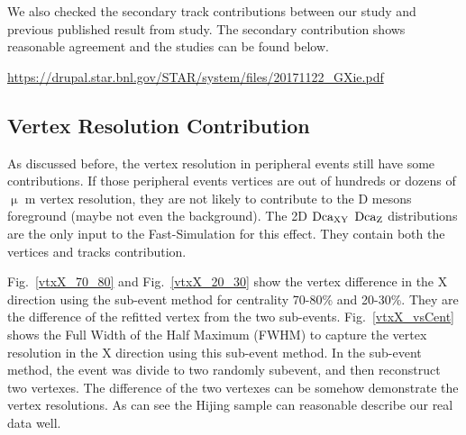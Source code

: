 We also checked the secondary track contributions between our study and previous published result from study. The secondary contribution shows reasonable agreement and the studies can be found below.

\url{https://drupal.star.bnl.gov/STAR/system/files/20171122_GXie.pdf}


\subsection{Vertex Resolution Contribution}
\label{concern2}

As discussed before, the vertex resolution in peripheral events still have some contributions. If those peripheral events vertices are out of hundreds or dozens of $\upmu$ m vertex resolution, they are not likely to contribute to the D mesons foreground (maybe not even the background). The 2D $\textup{Dca}_{\textup{XY}}$ $\textup{Dca}_\textup{Z}$ distributions are the only input to the Fast-Simulation for this effect. They contain both the vertices and tracks contribution. 

Fig.~\ref{vtxX_70_80} and Fig.~\ref{vtxX_20_30} show the vertex difference in the X direction using the sub-event method for centrality 70-80\% and 20-30\%. They are the difference of the refitted vertex from the two sub-events. Fig.~\ref{vtxX_vsCent} shows the Full Width of the Half Maximum (FWHM) to capture the vertex resolution in the X direction using this sub-event method. In the sub-event method, the event was divide to two randomly subevent, and then reconstruct two vertexes. The difference of the two vertexes can be somehow demonstrate the vertex resolutions. As can see the Hijing sample can reasonable describe our real data well.


